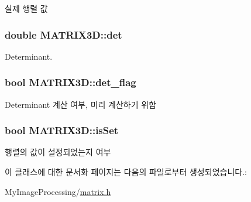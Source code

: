 실제 행렬 값 

\hypertarget{class_m_a_t_r_i_x3_d_a836b104900b7c16a92bda6e41612a77d}{
\subsubsection[{det}]{\setlength{\rightskip}{0pt plus 5cm}double M\-A\-T\-R\-I\-X3\-D\-::det\hspace{0.3cm}{\ttfamily [private]}}}\label{class_m_a_t_r_i_x3_d_a836b104900b7c16a92bda6e41612a77d}


Determinant. 

\hypertarget{class_m_a_t_r_i_x3_d_ab951cbc695222c9cd96d1f2990b1a662}{
\subsubsection[{det\-\_\-flag}]{\setlength{\rightskip}{0pt plus 5cm}bool M\-A\-T\-R\-I\-X3\-D\-::det\-\_\-flag\hspace{0.3cm}{\ttfamily [private]}}}\label{class_m_a_t_r_i_x3_d_ab951cbc695222c9cd96d1f2990b1a662}


Determinant 계산 여부, 미리 계산하기 위함 

\hypertarget{class_m_a_t_r_i_x3_d_a3d3bd9c2ee0c213ca2f69804c3db6ac6}{
\subsubsection[{is\-Set}]{\setlength{\rightskip}{0pt plus 5cm}bool M\-A\-T\-R\-I\-X3\-D\-::is\-Set\hspace{0.3cm}{\ttfamily [private]}}}\label{class_m_a_t_r_i_x3_d_a3d3bd9c2ee0c213ca2f69804c3db6ac6}


행렬의 값이 설정되었는지 여부 



이 클래스에 대한 문서화 페이지는 다음의 파일로부터 생성되었습니다.\-:\begin{DoxyCompactItemize}
\item 
My\-Image\-Processing/\hyperlink{matrix_8h}{matrix.\-h}\end{DoxyCompactItemize}

